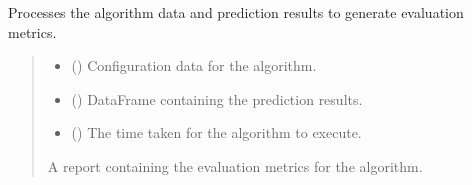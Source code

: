 \documentclass[letterpaper,10pt,english]{sphinxmanual}
\begin{document}
\begin{fulllineitems}
\begin{fulllineitems}
\label{\detokenize{application.services:application.services.AlgorithmDataProcesor.AlgorithmDataProcesor.process}}
\pysigstartsignatures
{}
\pysigstopsignatures
\sphinxAtStartPar
Processes the algorithm data and prediction results to generate evaluation metrics.
\begin{quote}\begin{description}
\begin{itemize}
\item {} 
\sphinxAtStartPar
{} ({\hyperref[\detokenize{domain.interfaces:domain.interfaces.AlgorithmConfigurator.AlgorithmConfigurator}]{}}) \textendash{} Configuration data for the algorithm.

\item {} 
\sphinxAtStartPar
{} () \textendash{} DataFrame containing the prediction results.

\item {} 
\sphinxAtStartPar
{} () \textendash{} The time taken for the algorithm to execute.

\end{itemize}

\sphinxAtStartPar
A report containing the evaluation metrics for the algorithm.

\sphinxAtStartPar
{\hyperref[\detokenize{domain.models:domain.models.BasicReport.BasicReport}]{}}

\end{description}\end{quote}

\end{fulllineitems}


\end{fulllineitems}
\end{document}
